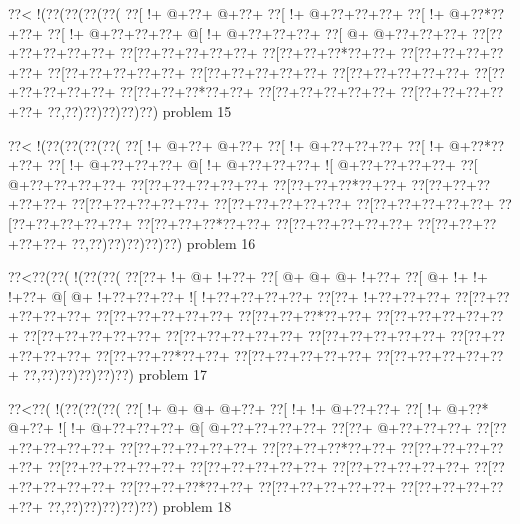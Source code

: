 \vbox{\vbox{\goo
\0??<\- !(\0??(\0??(\0??(\0??(
\0??[\- !+\- @+\0??+\- @+\0??+
\0??[\- !+\- @+\0??+\0??+\0??+
\0??[\- !+\- @+\0??*\0??+\0??+
\0??[\- !+\- @+\0??+\0??+\0??+
\- @[\- !+\- @+\0??+\0??+\0??+
\0??[\- @+\- @+\0??+\0??+\0??+
\0??[\0??+\0??+\0??+\0??+\0??+
\0??[\0??+\0??+\0??+\0??+\0??+
\0??[\0??+\0??+\0??*\0??+\0??+
\0??[\0??+\0??+\0??+\0??+\0??+
\0??[\0??+\0??+\0??+\0??+\0??+
\0??[\0??+\0??+\0??+\0??+\0??+
\0??[\0??+\0??+\0??+\0??+\0??+
\0??[\0??+\0??+\0??+\0??+\0??+
\0??[\0??+\0??+\0??*\0??+\0??+
\0??[\0??+\0??+\0??+\0??+\0??+
\0??[\0??+\0??+\0??+\0??+\0??+
\0??,\0??)\0??)\0??)\0??)\0??)
}
\hfil problem 15\hfil\break
}

\vbox{\vbox{\goo
\0??<\- !(\0??(\0??(\0??(\0??(
\0??[\- !+\- @+\0??+\- @+\0??+
\0??[\- !+\- @+\0??+\0??+\0??+
\0??[\- !+\- @+\0??*\0??+\0??+
\0??[\- !+\- @+\0??+\0??+\0??+
\- @[\- !+\- @+\0??+\0??+\0??+
\- ![\- @+\0??+\0??+\0??+\0??+
\0??[\- @+\0??+\0??+\0??+\0??+
\0??[\0??+\0??+\0??+\0??+\0??+
\0??[\0??+\0??+\0??*\0??+\0??+
\0??[\0??+\0??+\0??+\0??+\0??+
\0??[\0??+\0??+\0??+\0??+\0??+
\0??[\0??+\0??+\0??+\0??+\0??+
\0??[\0??+\0??+\0??+\0??+\0??+
\0??[\0??+\0??+\0??+\0??+\0??+
\0??[\0??+\0??+\0??*\0??+\0??+
\0??[\0??+\0??+\0??+\0??+\0??+
\0??[\0??+\0??+\0??+\0??+\0??+
\0??,\0??)\0??)\0??)\0??)\0??)
}
\hfil problem 16\hfil\break
}

\vbox{\vbox{\goo
\0??<\0??(\0??(\- !(\0??(\0??(
\0??[\0??+\- !+\- @+\- !+\0??+
\0??[\- @+\- @+\- @+\- !+\0??+
\0??[\- @+\- !+\- !+\- !+\0??+
\- @[\- @+\- !+\0??+\0??+\0??+
\- ![\- !+\0??+\0??+\0??+\0??+
\0??[\0??+\- !+\0??+\0??+\0??+
\0??[\0??+\0??+\0??+\0??+\0??+
\0??[\0??+\0??+\0??+\0??+\0??+
\0??[\0??+\0??+\0??*\0??+\0??+
\0??[\0??+\0??+\0??+\0??+\0??+
\0??[\0??+\0??+\0??+\0??+\0??+
\0??[\0??+\0??+\0??+\0??+\0??+
\0??[\0??+\0??+\0??+\0??+\0??+
\0??[\0??+\0??+\0??+\0??+\0??+
\0??[\0??+\0??+\0??*\0??+\0??+
\0??[\0??+\0??+\0??+\0??+\0??+
\0??[\0??+\0??+\0??+\0??+\0??+
\0??,\0??)\0??)\0??)\0??)\0??)
}
\hfil problem 17\hfil\break
}

\vbox{\vbox{\goo
\0??<\0??(\- !(\0??(\0??(\0??(
\0??[\- !+\- @+\- @+\- @+\0??+
\0??[\- !+\- !+\- @+\0??+\0??+
\0??[\- !+\- @+\0??*\- @+\0??+
\- ![\- !+\- @+\0??+\0??+\0??+
\- @[\- @+\0??+\0??+\0??+\0??+
\0??[\0??+\- @+\0??+\0??+\0??+
\0??[\0??+\0??+\0??+\0??+\0??+
\0??[\0??+\0??+\0??+\0??+\0??+
\0??[\0??+\0??+\0??*\0??+\0??+
\0??[\0??+\0??+\0??+\0??+\0??+
\0??[\0??+\0??+\0??+\0??+\0??+
\0??[\0??+\0??+\0??+\0??+\0??+
\0??[\0??+\0??+\0??+\0??+\0??+
\0??[\0??+\0??+\0??+\0??+\0??+
\0??[\0??+\0??+\0??*\0??+\0??+
\0??[\0??+\0??+\0??+\0??+\0??+
\0??[\0??+\0??+\0??+\0??+\0??+
\0??,\0??)\0??)\0??)\0??)\0??)
}
\hfil problem 18\hfil\break
}

